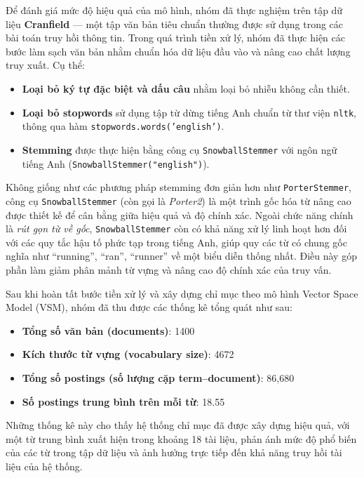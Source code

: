 Để đánh giá mức độ hiệu quả của mô hình, nhóm đã thực nghiệm trên tập dữ liệu \textbf{Cranfield} --- một tập văn bản tiêu chuẩn thường được sử dụng trong các bài toán truy hồi thông tin. Trong quá trình tiền xử lý, nhóm đã thực hiện các bước làm sạch văn bản nhằm chuẩn hóa dữ liệu đầu vào và nâng cao chất lượng truy xuất. Cụ thể:

\begin{itemize}
    \item \textbf{Loại bỏ ký tự đặc biệt và dấu câu} nhằm loại bỏ nhiễu không cần thiết.
    \item \textbf{Loại bỏ stopwords} sử dụng tập từ dừng tiếng Anh chuẩn từ thư viện \texttt{nltk}, thông qua hàm \texttt{stopwords.words('english')}.
    \item \textbf{Stemming} được thực hiện bằng công cụ \texttt{SnowballStemmer} với ngôn ngữ tiếng Anh (\texttt{SnowballStemmer("english")}).
\end{itemize}

Không giống như các phương pháp stemming đơn giản hơn như \texttt{PorterStemmer}, công cụ \texttt{SnowballStemmer} (còn gọi là \textit{Porter2}) là một trình gốc hóa từ nâng cao được thiết kế để cân bằng giữa hiệu quả và độ chính xác. Ngoài chức năng chính là \textit{rút gọn từ về gốc}, \texttt{SnowballStemmer} còn có khả năng xử lý linh hoạt hơn đối với các quy tắc hậu tố phức tạp trong tiếng Anh, giúp quy các từ có chung gốc nghĩa như ``running'', ``ran'', ``runner'' về một biểu diễn thống nhất. Điều này góp phần làm giảm phân mảnh từ vựng và nâng cao độ chính xác của truy vấn.

Sau khi hoàn tất bước tiền xử lý và xây dựng chỉ mục theo mô hình Vector Space Model (VSM), nhóm đã thu được các thống kê tổng quát như sau:

\begin{itemize}
    \item \textbf{Tổng số văn bản (documents)}: 1400
    \item \textbf{Kích thước từ vựng (vocabulary size)}: 4672
    \item \textbf{Tổng số postings (số lượng cặp term--document)}: 86,680
    \item \textbf{Số postings trung bình trên mỗi từ}: 18.55
\end{itemize}

Những thống kê này cho thấy hệ thống chỉ mục đã được xây dựng hiệu quả, với một từ trung bình xuất hiện trong khoảng 18 tài liệu, phản ánh mức độ phổ biến của các từ trong tập dữ liệu và ảnh hưởng trực tiếp đến khả năng truy hồi tài liệu của hệ thống.

